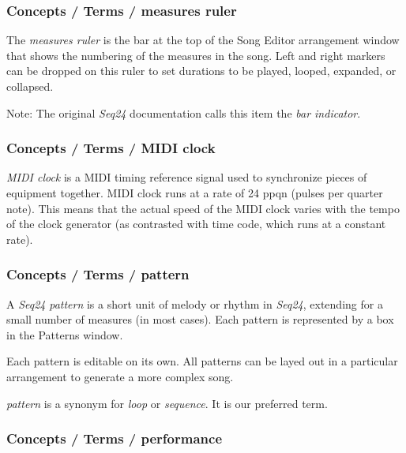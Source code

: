 \subsubsection{Concepts / Terms / measures ruler}
\label{subsubsec:concepts_terms_measures_ruler}

   The \textsl{measures ruler} is the bar at the top of the Song Editor
   arrangement window that shows the numbering of the measures in the song.
   Left and right markers can be dropped on this ruler to set durations to
   be played, looped, expanded, or collapsed.

   Note:
   The original \textsl{Seq24} documentation calls this item the
   \textsl{bar indicator}.

\subsubsection{Concepts / Terms / MIDI clock}
\label{subsubsec:concepts_terms_midi_clock}

   \textsl{MIDI clock} is
   a MIDI timing reference signal used to synchronize pieces of equipment
   together. MIDI clock runs at a rate of 24 ppqn (pulses per quarter note).
   This means that the actual speed of the MIDI clock varies with the tempo
   of the clock generator (as contrasted with time code, which runs at a
   constant rate).

\subsubsection{Concepts / Terms / pattern}
\label{subsubsec:concepts_terms_pattern}

   A \textsl{Seq24} \textsl{pattern}
   is a short unit of melody or rhythm in \textsl{Seq24},
   extending for a small number of measures (in most cases).
   Each pattern is represented by a box in the Patterns window.

   Each pattern is editable on its own.  All patterns can be layed out in
   a particular arrangement to generate a more complex song.

   \textsl{pattern} is a synonym for \textsl{loop} or \textsl{sequence}.
   It is our preferred term.

\subsubsection{Concepts / Terms / performance}
\label{subsubsec:concepts_terms_performance}

